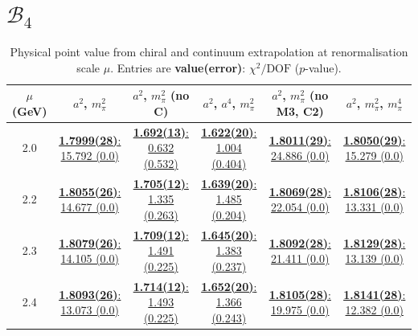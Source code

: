 \documentclass[12pt]{extarticle}
\begin{document}
\section{$\mathcal{B}_4$}
\begin{table}[h!]
\begin{center}
\begin{tabular}{|c|c|c|c|c|c|}
\hline
$\mu$ (GeV) & $a^2$, $m_\pi^2$& $a^2$, $m_\pi^2$ (no C)& $a^2$, $a^4$, $m_\pi^2$& $a^2$, $m_\pi^2$ (no M3, C2)& $a^2$, $m_\pi^2$, $m_\pi^4$\\
\hline
2.0& \hyperlink{SSpPP/SUSY/a2m2_20.pdf.1}{\textbf{1.7999(28)}: 15.792 (0.0)} & \hyperlink{SSpPP/SUSY/a2m2noC_20.pdf.1}{\textbf{1.692(13)}: 0.632 (0.532)} & \hyperlink{SSpPP/SUSY/a2a4m2_20.pdf.1}{\textbf{1.622(20)}: 1.004 (0.404)} & \hyperlink{SSpPP/SUSY/a2m2mcut_20.pdf.1}{\textbf{1.8011(29)}: 24.886 (0.0)} & \hyperlink{SSpPP/SUSY/a2m2m4_20.pdf.1}{\textbf{1.8050(29)}: 15.279 (0.0)}\\
2.2& \hyperlink{SSpPP/SUSY/a2m2_22.pdf.1}{\textbf{1.8055(26)}: 14.677 (0.0)} & \hyperlink{SSpPP/SUSY/a2m2noC_22.pdf.1}{\textbf{1.705(12)}: 1.335 (0.263)} & \hyperlink{SSpPP/SUSY/a2a4m2_22.pdf.1}{\textbf{1.639(20)}: 1.485 (0.204)} & \hyperlink{SSpPP/SUSY/a2m2mcut_22.pdf.1}{\textbf{1.8069(28)}: 22.054 (0.0)} & \hyperlink{SSpPP/SUSY/a2m2m4_22.pdf.1}{\textbf{1.8106(28)}: 13.331 (0.0)}\\
2.3& \hyperlink{SSpPP/SUSY/a2m2_23.pdf.1}{\textbf{1.8079(26)}: 14.105 (0.0)} & \hyperlink{SSpPP/SUSY/a2m2noC_23.pdf.1}{\textbf{1.709(12)}: 1.491 (0.225)} & \hyperlink{SSpPP/SUSY/a2a4m2_23.pdf.1}{\textbf{1.645(20)}: 1.383 (0.237)} & \hyperlink{SSpPP/SUSY/a2m2mcut_23.pdf.1}{\textbf{1.8092(28)}: 21.411 (0.0)} & \hyperlink{SSpPP/SUSY/a2m2m4_23.pdf.1}{\textbf{1.8129(28)}: 13.139 (0.0)}\\
2.4& \hyperlink{SSpPP/SUSY/a2m2_24.pdf.1}{\textbf{1.8093(26)}: 13.073 (0.0)} & \hyperlink{SSpPP/SUSY/a2m2noC_24.pdf.1}{\textbf{1.714(12)}: 1.493 (0.225)} & \hyperlink{SSpPP/SUSY/a2a4m2_24.pdf.1}{\textbf{1.652(20)}: 1.366 (0.243)} & \hyperlink{SSpPP/SUSY/a2m2mcut_24.pdf.1}{\textbf{1.8105(28)}: 19.975 (0.0)} & \hyperlink{SSpPP/SUSY/a2m2m4_24.pdf.1}{\textbf{1.8141(28)}: 12.382 (0.0)}\\
\hline
\end{tabular}
\caption{Physical point value from chiral and continuum extrapolation at renormalisation scale $\mu$. Entries are \textbf{value(error)}: $\chi^2/\text{DOF}$ ($p$-value).}
\end{center}
\end{table}
\end{document}
